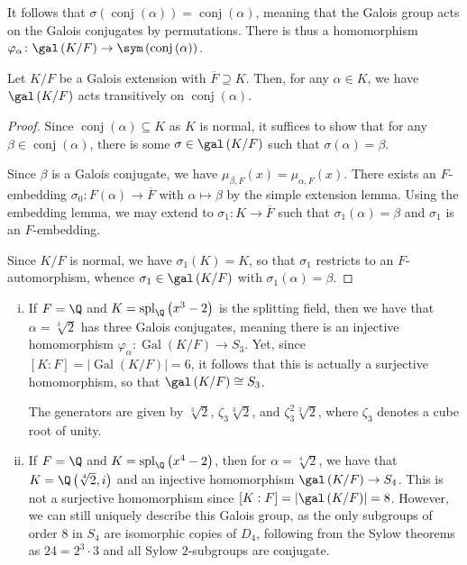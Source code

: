 \documentclass[10pt]{mypackage}
\begin{document}
It follows that $\sigma\left( \operatorname{conj}\left( \alpha \right) \right) = \operatorname{conj}\left( \alpha \right)$, meaning that the Galois group acts on the Galois conjugates by permutations. There is thus a homomorphism $\varphi_{\alpha}\colon \gal\left( K/F \right) \rightarrow \sym\left( \operatorname{conj}\left( \alpha \right) \right)$.
\begin{lemma}
  Let $K/F$ be a Galois extension with $ \overline{F}\supseteq K $. Then, for any $\alpha\in K$, we have $\gal\left( K/F \right)$ acts transitively on $\operatorname{conj}\left( \alpha \right)$.
\end{lemma}
\begin{proof}
  Since $\operatorname{conj}\left( \alpha \right)\subseteq K$ as $K$ is normal, it suffices to show that for any $\beta\in \operatorname{conj}\left( \alpha \right)$, there is some $\sigma\in \gal\left( K/F \right)$ such that $\sigma\left( \alpha \right) = \beta$.

  Since $\beta$ is a Galois conjugate, we have $\mu_{\beta,F}(x) = \mu_{\alpha,F}(x)$. There exists an $F$-embedding $\sigma_0\colon F\left( \alpha \right)\rightarrow \overline{F}$ with $\alpha\mapsto \beta$ by the simple extension lemma. Using the embedding lemma, we may extend to $\sigma_1\colon K\rightarrow \overline{F}$ such that $\sigma_1\left( \alpha \right) =\beta $ and $\sigma_1$ is an $F$-embedding.

  Since $K/F$ is normal, we have $\sigma_1\left( K \right) = K$, so that $\sigma_1$ restricts to an $F$-automorphism, whence $\sigma_1\in \gal\left( K/F \right)$ with $\sigma_1\left( \alpha \right) = \beta$.
\end{proof}
\begin{example}\hfill
  \begin{enumerate}[(i)]
    \item If $F = \Q$ and $K = \operatorname{spl}_{\Q}\left( x^3-2 \right)$ is the splitting field, then we have that $\alpha = \sqrt[3]{2}$ has three Galois conjugates, meaning there is an injective homomorphism $\varphi_{\alpha}\colon \operatorname{Gal}\left( K/F \right)\rightarrow S_3$. Yet, since $\left[ K:F \right] = \left\vert \operatorname{Gal}\left( K/F \right) \right\vert = 6$, it follows that this is actually a surjective homomorphism, so that $\gal\left( K/F \right) \cong S_3$.

      The generators are given by $\sqrt[3]{2}$, $\zeta_3\sqrt[3]{2}$, and $\zeta_3^2\sqrt[3]{2}$, where $\zeta_3$ denotes a cube root of unity.
    \item If $F = \Q$ and $K = \operatorname{spl}_{\Q}\left( x^4-2 \right)$, then for $\alpha = \sqrt[4]{2}$, we have that $K = \Q\left( \sqrt[4]{2},i \right)$ and an injective homomorphism $\gal\left( K/F \right)\rightarrow S_4$. This is not a surjective homomorphism since $\left[ K:F \right] = \left\vert \gal\left( K/F \right) \right\vert = 8$. However, we can still uniquely describe this Galois group, as the only subgroups of order $8$ in $S_4$ are isomorphic copies of $D_4$, following from the Sylow theorems as $24 = 2^3\cdot 3$ and all Sylow $2$-subgroups are conjugate.
  \end{enumerate}
\end{example}
\end{document}
